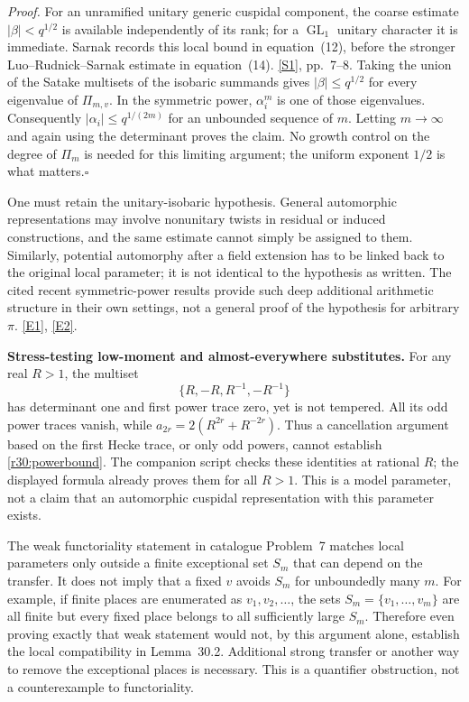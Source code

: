 \documentclass[11pt,a4paper]{article}
\newcommand{\sref}[2]{\hyperlink{source:#1:#2}{[S#2]}}
\newcommand{\eref}[2]{\hyperlink{extra:#1:#2}{[E#2]}}
\numberwithin{equation}{section}
\begin{document}
\emph{Proof.} For an unramified unitary generic cuspidal component, the
coarse estimate $|\beta|<q^{1/2}$ is available independently of its rank;
for a $\operatorname{GL}_1$ unitary character it is immediate. Sarnak
records this local bound in equation~(12), before the stronger
Luo--Rudnick--Sarnak estimate in equation~(14). \sref{30}{1}, pp.~7--8.
Taking the union of the Satake multisets of the isobaric summands gives
$|\beta|\le q^{1/2}$ for every eigenvalue of $\Pi_{m,v}$.
In the symmetric power, $\alpha_i^m$ is one of those eigenvalues.
Consequently $|\alpha_i|\le q^{1/(2m)}$ for an unbounded sequence of $m$.
Letting $m\to\infty$ and again using the determinant proves the claim.
No growth control on the degree of $\Pi_m$ is needed for this limiting
argument; the uniform exponent $1/2$ is what matters.\hfill$\square$

One must retain the unitary-isobaric hypothesis. General automorphic
representations may involve nonunitary twists in residual or induced
constructions, and the same estimate cannot simply be assigned to them.
Similarly, potential automorphy after a field extension has to be linked
back to the original local parameter; it is not identical to the
hypothesis as written. The cited recent symmetric-power results provide
such deep additional arithmetic structure in their own settings, not a
general proof of the hypothesis for arbitrary $\pi$. \eref{30}{1},
\eref{30}{2}.

\medskip
\textbf{Stress-testing low-moment and almost-everywhere substitutes.}
For any real $R>1$, the multiset
\[
               \{R,-R,R^{-1},-R^{-1}\}
\]
has determinant one and first power trace zero, yet is not tempered.
All its odd power traces vanish, while
$a_{2r}=2(R^{2r}+R^{-2r})$. Thus a cancellation argument based on the
first Hecke trace, or only odd powers, cannot establish
\eqref{r30:powerbound}. The companion script checks these identities at
rational $R$; the displayed formula already proves them for all $R>1$.
This is a model parameter, not a claim that an automorphic cuspidal
representation with this parameter exists.

The weak functoriality statement in catalogue Problem~7 matches local
parameters only outside a finite exceptional set $S_m$ that can depend
on the transfer. It does not imply that a fixed $v$ avoids $S_m$ for
unboundedly many $m$. For example, if finite places are enumerated as
$v_1,v_2,\ldots$, the sets $S_m=\{v_1,\ldots,v_m\}$ are all finite but
every fixed place belongs to all sufficiently large $S_m$.
Therefore even proving exactly that weak statement would not, by this
argument alone, establish the local compatibility in Lemma~30.2.
Additional strong transfer or another way to remove the exceptional
places is necessary. This is a quantifier obstruction, not a
counterexample to functoriality.
\end{document}

